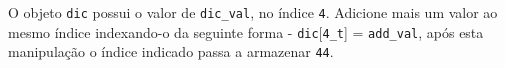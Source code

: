 \documentclass[12pt,varwidth=16cm,border=1pt]{standalone}
\begin{document}
O objeto \verb+dic+ possui o valor de \verb+dic_val+, no índice \verb+4+. Adicione mais um valor ao mesmo índice indexando-o da seguinte forma - \verb+dic+[\verb+4_t+] = \verb+add_val+, após esta manipulação o índice indicado  passa a armazenar \verb+44+.

\questiomtrue
\end{document}
